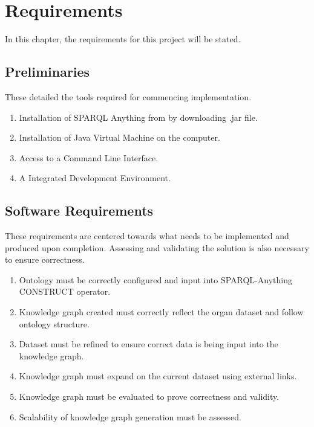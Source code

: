 \chapter{Requirements}
In this chapter, the requirements for this project will be stated. 

\section{Preliminaries}
\hspace{0.5cm} These detailed the tools required for commencing implementation.
\begin{enumerate}
    \itemsep0em 
\item Installation of SPARQL Anything from \cite{sparqlanythinggithub} by downloading .jar file.
\item Installation of Java Virtual Machine on the computer. 
\item Access to a Command Line Interface.
\item A Integrated Development Environment.
\end{enumerate}

\section{Software Requirements}
\hspace{0.5cm} These requirements are centered towards what needs to be implemented and produced upon completion. Assessing and validating the solution is also necessary to ensure correctness.
\begin{enumerate}
    \itemsep0em 
\item Ontology must be correctly configured and input into SPARQL-Anything CONSTRUCT operator.
\item Knowledge graph created must correctly reflect the organ dataset and follow ontology structure.
\item Dataset must be refined to ensure correct data is being input into the knowledge graph.
\item Knowledge graph must expand on the current dataset using external links.
\item Knowledge graph must be evaluated to prove correctness and validity.
\item Scalability of knowledge graph generation must be assessed.
\end{enumerate}

